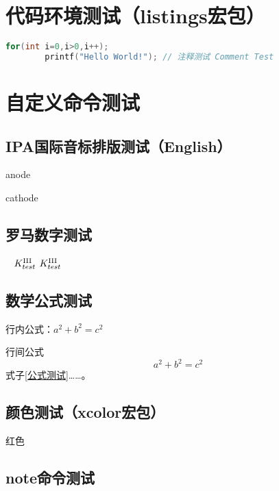 \section{代码环境测试（listings宏包）}
\sampletext

\begin{lstlisting}[language={C},title={\textsf{C语言代码段测试}}]
    for(int i=0,i>0,i++);
        printf("Hello World!"); // 注释测试 Comment Test
\end{lstlisting}

\sampletext

\section{自定义命令测试}
\subsection{IPA国际音标排版测试（English）}
anode 

cathode 

\subsection{罗马数字测试}
\  $K_{test}^{\text{\Romannum{3}}}$ $K_{test}^{\mathrm{\Romannum{3}}}$

\subsection{数学公式测试}
行内公式：$a^2 + b^2 = c^2$

行间公式
\begin{equation}
    a^2 + b^2 = c^2 \label{公式测试}
\end{equation}
式子\eqref{公式测试}……。

\subsection{颜色测试（xcolor宏包）}
 { 红色}


\subsection{note命令测试}




